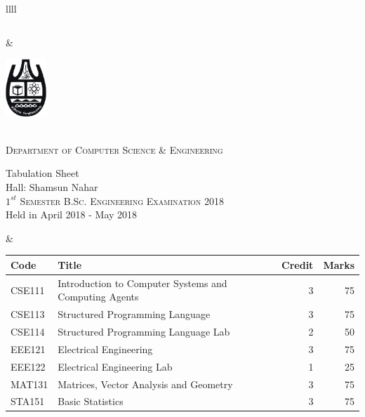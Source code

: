 \documentclass[11pt]{article}
\begin{document}
\begin{table}[ht]
\begin{tabularx}{\linewidth}{llll}
\begin{minipage}[m]{0.3\linewidth}
\begin{small}
{\begin{tabular}{ |c|}
			\end{tabular}
		}
	\end{small}
\end{minipage}

&
     \hspace{-5in}
\begin{minipage}[m]{0.35\textwidth} \centering
\includegraphics[width=0.6in]{cu-logo.jpg}
	
	\smallskip
	
	\\
	\textsc{Department of Computer Science \& Engineering}\\
	
	\smallskip
	
	{\large {\sc Tabulation Sheet}}\\
	{\large {\sc Hall: Shamsun Nahar}}\\
	
	\smallskip
	\textsc{$1^{st}$ Semester B.Sc. Engineering Examination 2018}\\
	{Held in April 2018 - May 2018}\\
\end{minipage}
&
\hspace{1cm}
\begin{minipage}[m]{0.3\linewidth} \flushright
	\hspace{-5cm}
	\begin{small}
		\renewcommand{\arraystretch}{1.01}
		\begin{tabular} {|l|l|r|r|}
			\hline \hline Code & Title  & Credit &  Marks \\ \hline
\hline  CSE111 & Introduction to Computer Systems and Computing Agents & 3 & 75  \\
\hline  CSE113 & Structured Programming Language & 3 & 75  \\
\hline  CSE114 & Structured Programming Language Lab & 2 & 50  \\
\hline  EEE121 & Electrical Engineering & 3 & 75  \\
\hline  EEE122 & Electrical Engineering Lab & 1 & 25  \\
\hline  MAT131 & Matrices, Vector Analysis and Geometry & 3 & 75  \\
\hline  STA151 & Basic Statistics & 3 & 75  \\
 \hline
		\end{tabular}
	\end{small} 
\end{minipage}


\end{tabularx}
\end{table}
\end{document}
